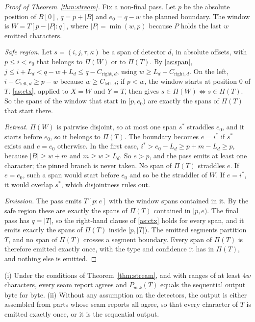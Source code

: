 \begin{proof}[Proof of Theorem~\ref{thm:stream}]
Fix a non-final pass. Let $p$ be the absolute position of $B[0]$, $q = p + |B|$ and $e_0 = q - w$ the planned boundary. The window is $W = T[p - |P| : q]$, where $|P| = \min(w, p)$ because $P$ holds the last $w$ emitted characters.

\emph{Safe region.} Let $s = (i, j, \tau, \kappa)$ be a span of detector $d$, in absolute offsets, with $p \le i < e_0$ that belongs to $\Pi(W)$ or to $\Pi(T)$. By \ref{as:span}, $j \le i + L_d < q - w + L_d \le q - C_{\mathrm{right},d}$, using $w \ge L_d + C_{\mathrm{right},d}$. On the left, $i - C_{\mathrm{left},d} \ge p - w$ because $w \ge C_{\mathrm{left},d}$; if $p < w$, the window starts at position 0 of $T$. \ref{as:ctx}, applied to $X = W$ and $Y = T$, then gives $s \in \Pi(W) \Leftrightarrow s \in \Pi(T)$. So the spans of the window that start in $[p, e_0)$ are exactly the spans of $\Pi(T)$ that start there.

\emph{Retreat.} $\Pi(W)$ is pairwise disjoint, so at most one span $s^{*}$ straddles $e_0$, and it starts before $e_0$, so it belongs to $\Pi(T)$. The boundary becomes $e = i^{*}$ if $s^{*}$ exists and $e = e_0$ otherwise. In the first case, $i^{*} > e_0 - L_d \ge p + m - L_d \ge p$, because $|B| \ge w + m$ and $m \ge w \ge L_d$. So $e > p$, and the pass emits at least one character; the pinned branch is never taken. No span of $\Pi(T)$ straddles $e$. If $e = e_0$, such a span would start before $e_0$ and so be the straddler of $W$. If $e = i^{*}$, it would overlap $s^{*}$, which disjointness rules out.

\emph{Emission.} The pass emits $T[p{:}e]$ with the window spans contained in it. By the safe region these are exactly the spans of $\Pi(T)$ contained in $[p, e)$. The final pass has $q = |T|$, so the right-hand clause of \ref{as:ctx} holds for every span, and it emits exactly the spans of $\Pi(T)$ inside $[p, |T|)$. The emitted segments partition $T$, and no span of $\Pi(T)$ crosses a segment boundary. Every span of $\Pi(T)$ is therefore emitted exactly once, with the type and confidence it has in $\Pi(T)$, and nothing else is emitted.
\end{proof}

\begin{theorem}\label{thm:par}
(i) Under the conditions of Theorem~\ref{thm:stream}, and with ranges of at least $4w$ characters, every seam report agrees and $P_{w,k}(T)$ equals the sequential output byte for byte. (ii) Without any assumption on the detectors, the output is either assembled from parts whose seam reports all agree, so that every character of $T$ is emitted exactly once, or it is the sequential output.
\end{theorem}

